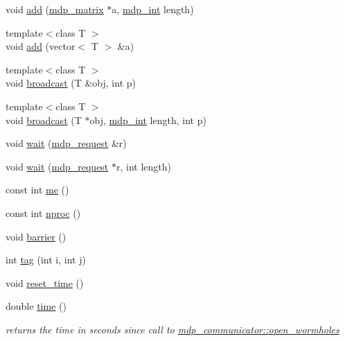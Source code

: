 \begin{DoxyCompactItemize}
void \hyperlink{classmdp__communicator_a03e473c3c953f458504fb21872a2a244}{add} (\hyperlink{classmdp__matrix}{mdp\+\_\+matrix} $\ast$a, \hyperlink{mdp__global__vars_8h_aaa1ad9d0dcd2124aa5af0120d9954174}{mdp\+\_\+int} length)
\item 
{\footnotesize template$<$class T $>$ }\\void \hyperlink{classmdp__communicator_a146ff6dcc18accdc7c86e6234394e040}{add} (vector$<$ T $>$ \&a)
\item 
{\footnotesize template$<$class T $>$ }\\void \hyperlink{classmdp__communicator_a386ed4c41f300bf8afbe178a359d663e}{broadcast} (T \&obj, int p)
\item 
{\footnotesize template$<$class T $>$ }\\void \hyperlink{classmdp__communicator_ae2f6349d66755c915c42c73635b29cf7}{broadcast} (T $\ast$obj, \hyperlink{mdp__global__vars_8h_aaa1ad9d0dcd2124aa5af0120d9954174}{mdp\+\_\+int} length, int p)
\item 
void \hyperlink{classmdp__communicator_ae63ed716fd7a459031dc2fc76da7c258}{wait} (\hyperlink{mdp__communicator_8h_ad8cbf5bc85a849902c39cd29d3f9a8f1}{mdp\+\_\+request} \&r)
\item 
void \hyperlink{classmdp__communicator_aca879bd68c152a2831d37455c7bffcc9}{wait} (\hyperlink{mdp__communicator_8h_ad8cbf5bc85a849902c39cd29d3f9a8f1}{mdp\+\_\+request} $\ast$r, int length)
\item 
const int \hyperlink{classmdp__communicator_ab4a002ef4c8bddc3133be4a1f9c6c3f8}{me} ()
\item 
const int \hyperlink{classmdp__communicator_af257b72bd642da879cb019b8cc6ebc6d}{nproc} ()
\item 
void \hyperlink{classmdp__communicator_a46a0990eb357e60a6768c706a2aaf272}{barrier} ()
\item 
int \hyperlink{classmdp__communicator_a927db59c7ab066becc693d3b944d7dfa}{tag} (int i, int j)
\item 
void \hyperlink{classmdp__communicator_a46086387c07ac505f7658718b52c073e}{reset\+\_\+time} ()
\item 
double \hyperlink{classmdp__communicator_a7e725836b00c3485cd02b3ad001cf6dd}{time} ()
\begin{DoxyCompactList}\small\item\em returns the time in seconds since call to \hyperlink{classmdp__communicator_af2c43869a689b8f1d020d4c4995b0cee}{mdp\+\_\+communicator\+::open\+\_\+wormholes} \end{DoxyCompactList}\item 

\end{DoxyCompactItemize}
